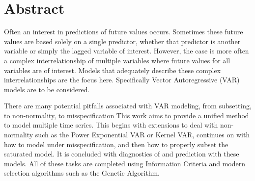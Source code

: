 \chapter*{Abstract}\label{ch:abstract}

Often an interest in predictions of future values occurs. Sometimes these
future values are based solely on a single predictor, whether that predictor
is another variable or simply the lagged variable of interest. However, the
case is more often a complex interrelationship of multiple variables where
future values for all variables are of interest. Models that adequately
describe these complex interrelationships are the focus here. Specifically
Vector Autoregressive (VAR) models are to be considered.

There are many potential pitfalls associated with VAR modeling, from
subsetting, to non-normality, to misspecification This work aims to provide
a unified method to model multiple time series. This begins with extensions
to deal with non-normality such as the Power Exponential VAR or Kernel VAR,
continues on with how to model under misspecification, and then how to
properly subset the saturated model. It is concluded with diagnostics of and
prediction with these models. All of these tasks are completed using
Information Criteria and modern selection algorithms such as the Genetic
Algorithm.
